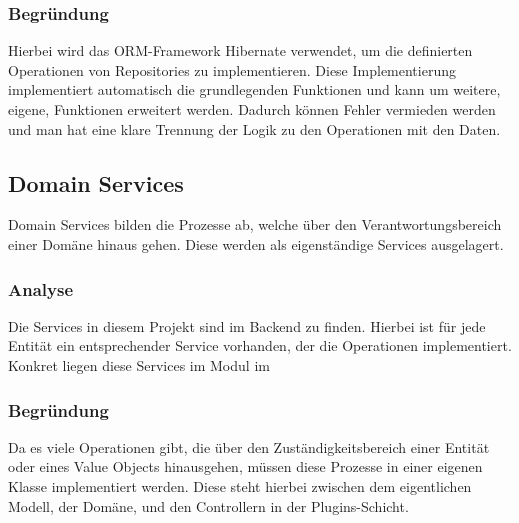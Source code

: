         \subsubsection{Begründung}
        Hierbei wird das ORM-Framework Hibernate verwendet, um die definierten Operationen von Repositories zu implementieren. Diese Implementierung implementiert automatisch die grundlegenden Funktionen und kann um weitere, eigene, Funktionen erweitert werden. Dadurch können Fehler vermieden werden und man hat eine klare Trennung der Logik zu den Operationen mit den Daten.
        
    \subsection{Domain Services}
    Domain Services bilden die Prozesse ab, welche über den Verantwortungsbereich einer Domäne hinaus gehen. Diese werden als eigenständige Services ausgelagert.

        \subsubsection{Analyse}
        Die Services in diesem Projekt sind im Backend zu finden. Hierbei ist für jede Entität ein entsprechender Service vorhanden, der die Operationen implementiert. Konkret liegen diese Services im Modul  im 

        \subsubsection{Begründung}
        Da es viele Operationen gibt, die über den Zuständigkeitsbereich einer Entität oder eines Value Objects hinausgehen, müssen diese Prozesse in einer eigenen Klasse implementiert werden. Diese steht hierbei zwischen dem eigentlichen Modell, der Domäne, und den Controllern in der Plugins-Schicht.